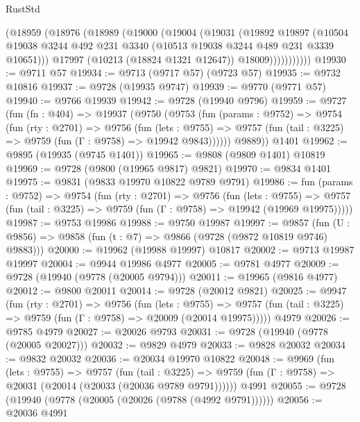 \begin{lexlean}{RustStd}
\begin{coremodule}
{\begin{coremodule}
{{{{{{{{{{{{{{{{{{{{{{{{{{              (@18959
                (@18976
                  (@18989
                    (@19000
                      (@19004
                        (@19031
                          (@19892
                            @19897
                            (@10504
                              @19038
                              @3244
                              @492
                              @231
                              @3340
                              (@10513 @19038 @3244 @489 @231 @3339 @10651)))
                          @17997
                          (@10213 (@18824 @1321 @12647))
                          @18009)))))))))))
@19930 := @9711 @57
@19934 := @9713 (@9717 @57) (@9723 @57)
@19935 := @9732 @10816
@19937 := @9728 (@19935 @9747)
@19939 := @9770 (@9771 @57)
@19940 := @9766 @19939
@19942 := @9728 (@19940 @9796)
@19959 := @9727
    (fun (fn : @404) =>
    @19937
      (@9750
        (@9753
          (fun (params : @9752) =>
          @9754
            (fun (rty : @2701) =>
            @9756
              (fun (lets : @9755) =>
              @9757 (fun (tail : @3225) => @9759 (fun (Γ : @9758) => @19942 @9843))))))
        @9889))
    @1401
@19962 := @9895 (@19935 (@9745 @1401))
@19965 := @9808 (@9809 @1401) @10819
@19969 := @9728 (@9800 (@19965 @9817) @9821)
@19970 := @9834 @1401
@19975 := @9831 (@9833 @19970 @10822 @9789 @9791)
@19986 := fun (params : @9752) =>
  @9754
    (fun (rty : @2701) =>
    @9756
      (fun (lets : @9755) =>
      @9757 (fun (tail : @3225) => @9759 (fun (Γ : @9758) => @19942 (@19969 @19975)))))
@19987 := @9753 @19986
@19988 := @9750 @19987
@19997 := @9857
    (fun (U : @9856) => @9858 (fun (t : @7) => @9866 (@9728 (@9872 @10819 @9746) @9883)))
@20000 := @19962 (@19988 @19997) @10817
@20002 := @9713 @19987 @19997
@20004 := @9944 @19986 @4977
@20005 := @9781 @4977
@20009 := @9728 (@19940 (@9778 (@20005 @9794)))
@20011 := @19965 (@9816 @4977)
@20012 := @9800 @20011
@20014 := @9728 (@20012 @9821)
@20025 := @9947
    (fun (rty : @2701) =>
    @9756
      (fun (lets : @9755) =>
      @9757 (fun (tail : @3225) => @9759 (fun (Γ : @9758) => @20009 (@20014 @19975)))))
    @4979
@20026 := @9785 @4979
@20027 := @20026 @9793
@20031 := @9728 (@19940 (@9778 (@20005 @20027)))
@20032 := @9829 @4979
@20033 := @9828 @20032
@20034 := @9832 @20032
@20036 := @20034 @19970 @10822
@20048 := @9969
    (fun (lets : @9755) =>
    @9757
      (fun (tail : @3225) =>
      @9759 (fun (Γ : @9758) => @20031 (@20014 (@20033 (@20036 @9789 @9791))))))
    @4991
@20055 := @9728 (@19940 (@9778 (@20005 (@20026 (@9788 (@4992 @9791))))))
@20056 := @20036 @4991
}}}}}}}}}}}}}}}}}}}}}}}}}}
\end{coremodule}}
\end{coremodule}
\end{lexlean}

